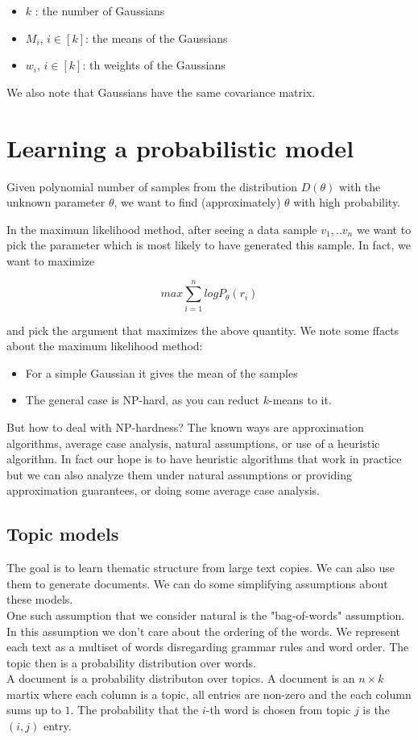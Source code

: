 \documentclass[11pt]{article}
\begin{document}
\begin{itemize}
\item $k$ : the number of Gaussians
\item $M_i$, $i \in [k]$: the means of the Gaussians
\item $w_i$, $i \in [k]$: th weights of the Gaussians
\end{itemize}

We also note that Gaussians have the same covariance matrix.


\section{Learning a probabilistic model}

 Given polynomial number of samples from the distribution $D(\theta)$ with the unknown parameter $\theta$, we want to find (approximately) $\theta$ with high probability.


In the maximum likelihood method, after seeing a data sample $v_1,..v_n$ we want to pick the parameter which is most likely to have generated this sample.
 In fact, we want to maximize

\[  max \sum_{i=1}^n logP_{\theta}(r_i)  \]
 
and pick the argument that maximizes the above quantity.
We note some ffacts about the maximum likelihood method:

\begin{itemize}
\item For a simple Gaussian it gives the mean of the samples

\item The general case is NP-hard, as you can reduct $k$-means to it.

\end{itemize}

But how to deal with NP-hardness? The known ways are approximation algorithms, average case analysis, natural assumptions, or use of a heuristic algorithm. In fact our hope is to have heuristic algorithms that work in practice but we can also analyze them under natural assumptions or providing approximation guarantees, or doing some average case analysis.

\subsection{Topic models}

The goal is to learn thematic structure from large text copies. We can also use them to generate documents. We can do some simplifying assumptions about these models.\\
One  such assumption that we consider natural is the "bag-of-words" assumption. In this assumption we don't care about the ordering of the words. We represent each text as a multiset of words disregarding grammar rules and word order. The topic then is a probability distribution over words.\\
A document is a probability distributon over topics. A document is an $n \times k$ martix where each column is a topic, all entries are non-zero and the each column sums up to $1$. The probability that the $i$-th word is chosen from topic $j$ is the $(i,j)$ entry.\\
\end{document}
